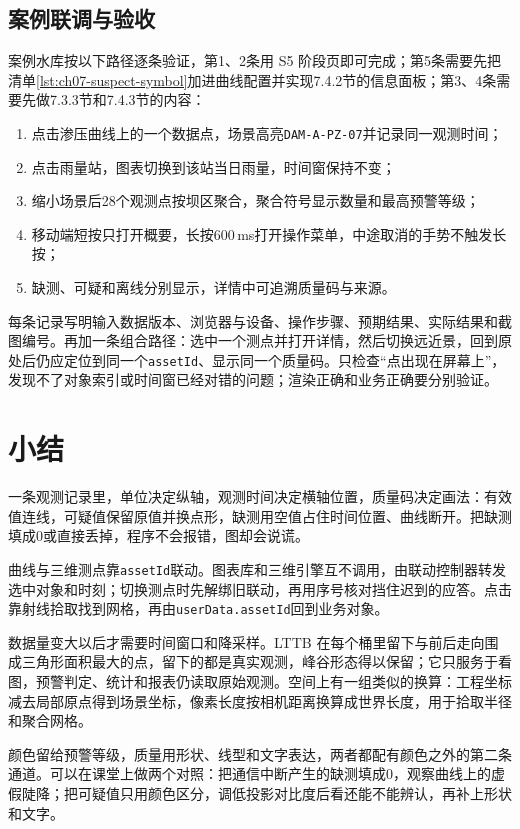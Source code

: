 \subsection{案例联调与验收}

案例水库按以下路径逐条验证，第1、2条用 S5 阶段页即可完成；第5条需要先把清单\ref{lst:ch07-suspect-symbol}加进曲线配置并实现7.4.2节的信息面板；第3、4条需要先做7.3.3节和7.4.3节的内容：

\begin{enumerate}
\item 点击渗压曲线上的一个数据点，场景高亮\texttt{DAM-A-PZ-07}并记录同一观测时间；
\item 点击雨量站，图表切换到该站当日雨量，时间窗保持不变；
\item 缩小场景后28个观测点按坝区聚合，聚合符号显示数量和最高预警等级；
\item 移动端短按只打开概要，长按600\,ms打开操作菜单，中途取消的手势不触发长按；
\item 缺测、可疑和离线分别显示，详情中可追溯质量码与来源。
\end{enumerate}

每条记录写明输入数据版本、浏览器与设备、操作步骤、预期结果、实际结果和截图编号。再加一条组合路径：选中一个测点并打开详情，然后切换远近景，回到原处后仍应定位到同一个\texttt{assetId}、显示同一个质量码。只检查“点出现在屏幕上”，发现不了对象索引或时间窗已经对错的问题；渲染正确和业务正确要分别验证。

\section*{小结}

一条观测记录里，单位决定纵轴，观测时间决定横轴位置，质量码决定画法：有效值连线，可疑值保留原值并换点形，缺测用空值占住时间位置、曲线断开。把缺测填成0或直接丢掉，程序不会报错，图却会说谎。

曲线与三维测点靠\texttt{assetId}联动。图表库和三维引擎互不调用，由联动控制器转发选中对象和时刻；切换测点时先解绑旧联动，再用序号核对挡住迟到的应答。点击靠射线拾取找到网格，再由\texttt{userData.assetId}回到业务对象。

数据量变大以后才需要时间窗口和降采样。LTTB 在每个桶里留下与前后走向围成三角形面积最大的点，留下的都是真实观测，峰谷形态得以保留；它只服务于看图，预警判定、统计和报表仍读取原始观测。空间上有一组类似的换算：工程坐标减去局部原点得到场景坐标，像素长度按相机距离换算成世界长度，用于拾取半径和聚合网格。

颜色留给预警等级，质量用形状、线型和文字表达，两者都配有颜色之外的第二条通道。可以在课堂上做两个对照：把通信中断产生的缺测填成0，观察曲线上的虚假陡降；把可疑值只用颜色区分，调低投影对比度后看还能不能辨认，再补上形状和文字。

